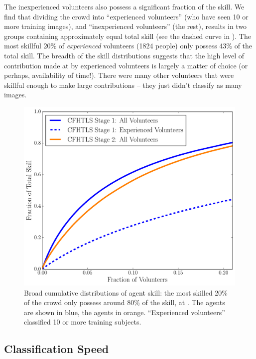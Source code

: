 \documentclass[useAMS,usenatbib,a4paper]{mn2e}
\begin{document}
The inexperienced volunteers also possess a significant fraction of the skill.
We find that dividing the crowd into ``experienced volunteers'' (who have seen
10 or more training images), and ``inexperienced volunteers'' (the rest),
results in two groups containing approximately equal total skill (see the dashed
curve in ). The most skillful 20\% of {\it
experienced} volunteers (1824 people) only possess 43\% of the total skill.
The breadth of the skill distributions suggests that  the high level of
contribution made at \SW by experienced volunteers is largely a matter of choice
(or perhaps, availability of time!). There were many other volunteers that  were
skillful enough to make large contributions -- they just didn't classify as many
images.

\begin{figure}
\centering\includegraphics[width=0.9\linewidth]{crowd_skill_cumul.pdf}
\caption{Broad cumulative distributions of agent skill:
the most skilled 20\% of the crowd only possess around 80\% of the skill,
at \StageOne. The \StageOne agents
are shown in blue, the \StageTwo agents in orange. ``Experienced volunteers''
classified 10 or more training subjects.}
\label{fig:crowd:cumulskillplot}
\end{figure}



\subsection{Classification Speed}
\label{sec:results:speed}
\end{document}
